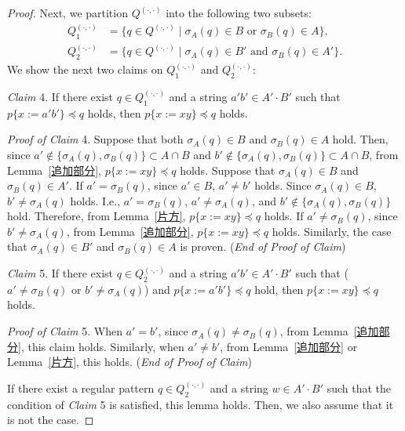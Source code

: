 \begin{proof}
Next, we partition $Q^{(\cdot,\cdot)}$ into the following two subsets:
\begin{align*}
  Q_{1}^{(\cdot,\cdot)} & = \{q \in Q^{(\cdot,\cdot)} \mid \sigma_{A}(q) \in B \mbox{ or } \sigma_{B}(q) \in A\},\\
  Q_{2}^{(\cdot,\cdot)} & = \{q \in Q^{(\cdot,\cdot)} \mid \sigma_{A}(q) \in B' \mbox{ and } \sigma_{B}(q) \in A'\}.
\end{align*}
We show the next two claims on $Q_{1}^{(\cdot,\cdot)}$ and $Q_{2}^{(\cdot,\cdot)}$:

\smallskip

\noindent
\textit{Claim} 4.
If there exist $q \in Q_{1}^{(\cdot,\cdot)}$ and a string $a'b' \in A'\cdot B'$ such that $p\{x:=a'b'\} \preceq q$ holds, then $p\{x:=xy\} \preceq q$ holds.

\smallskip

\noindent
\textit{Proof of Claim} 4.
Suppose that both $\sigma_{A}(q) \in B$ and $\sigma_{B}(q) \in A$ hold. Then, since $a' \not\in \{\sigma_{A}(q), \sigma_{B}(q)\} \subset A\cap B$ and $b' \not\in \{\sigma_{A}(q), \sigma_{B}(q)\} \subset A\cap B$, from Lemma~\ref{追加部分}, $p\{x:=xy\} \preceq q$ holds.
Suppose that $\sigma_{A}(q)\in B$ and $\sigma_{B}(q)\in A'$.
If $a' = \sigma_{B}(q)$, since $a' \in B$, $a' \not= b'$ holds.
Since $\sigma_{A}(q)\in B$, $b' \not= \sigma_{A}(q)$ holds.
I.e., $a' = \sigma_{B}(q)$, $a' \not= \sigma_{A}(q)$, and $b' \not\in \{\sigma_{A}(q), \sigma_{B}(q)\}$ hold.
Therefore, from Lemma~\ref{片方}, $p\{x:=xy\} \preceq q$ holds.
If $a' \not= \sigma_{B}(q)$, since $b' \not= \sigma_{A}(q)$, from Lemma~\ref{追加部分}, $p\{x:=xy\} \preceq q$ holds.
Similarly, the case that $\sigma_{A}(q)\in B'$ and $\sigma_{B}(q)\in A$ is proven. (\textit{End of Proof of Claim})

\smallskip

\noindent
\textit{Claim} 5.
If there exist $q \in Q_{2}^{(\cdot,\cdot)}$ and a string $a'b' \in A'\cdot B'$ such that ($a' \not= \sigma_{B}(q)$ or $b' \not= \sigma_{A}(q)$) and $p\{x:=a'b'\} \preceq q$ hold, then $p\{x:=xy\} \preceq q$ holds.
 
\smallskip

\noindent
\textit{Proof of Claim} 5.
When $a'=b'$, since $\sigma_{A}(q) \not= \sigma_{B}(q)$, from Lemma~\ref{追加部分}, this claim holds. Similarly, when $a' \not = b'$, from Lemma~\ref{追加部分} or Lemma~\ref{片方}, this holds.  (\textit{End of Proof of Claim})
  
\smallskip

\noindent
If there exist a regular pattern $q \in Q_{2}^{(\cdot,\cdot)}$ and a string $w \in A'\cdot B'$ such that the condition of \textit{Claim} 5 is satisfied, this lemma holds. Then, we also assume that it is not the case.


\end{proof}
